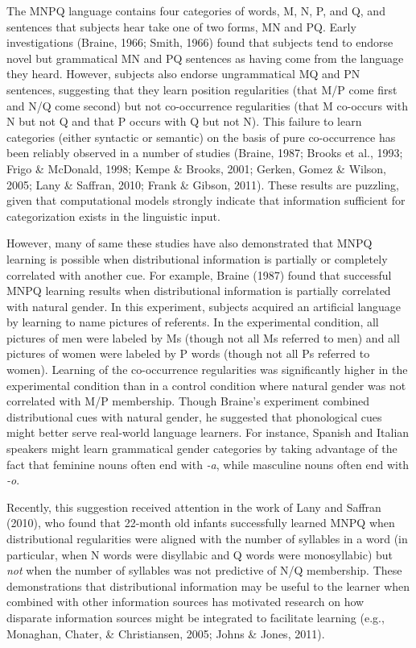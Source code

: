 \documentclass[man,floatsintext]{apa6}
\begin{document}
The MNPQ language contains four categories of words, M, N, P, and Q,
and sentences that subjects hear take one of two forms, MN and
PQ. Early investigations (Braine, 1966; Smith, 1966) found that
subjects tend to endorse novel but grammatical MN and PQ sentences as
having come from the language they heard. However, subjects also
endorse ungrammatical MQ and PN sentences, suggesting that they learn
position regularities (that M/P come first and N/Q come second) but
not co-occurrence regularities (that M co-occurs with N but not Q and
that P occurs with Q but not N). This failure to learn categories
(either syntactic or semantic) on the basis of pure co-occurrence has
been reliably observed in a number of studies (Braine, 1987; Brooks et
al., 1993; Frigo \& McDonald, 1998; Kempe \& Brooks, 2001; Gerken,
Gomez \& Wilson, 2005; Lany \& Saffran, 2010; Frank \& Gibson,
2011). These results are puzzling, given that computational models
strongly indicate that information sufficient for categorization
exists in the linguistic input.

However, many of same these studies have also demonstrated that MNPQ
learning is possible when distributional information is partially or
completely correlated with another cue. For example, Braine (1987)
found that successful MNPQ learning results when distributional
information is partially correlated with natural gender. In this
experiment, subjects acquired an artificial language by learning to
name pictures of referents. In the experimental condition, all
pictures of men were labeled by Ms (though not all Ms referred to men)
and all pictures of women were labeled by P words (though not all Ps
referred to women). Learning of the co-occurrence regularities was
significantly higher in the experimental condition than in a control
condition where natural gender was not correlated with M/P
membership. Though Braine's experiment combined distributional cues
with natural gender, he suggested that phonological cues might better
serve real-world language learners. For instance, Spanish and Italian
speakers might learn grammatical gender categories by taking advantage
of the fact that feminine nouns often end with \emph{-a}, while
masculine nouns often end with \emph{-o}.

Recently, this suggestion received attention in the work of Lany and
Saffran (2010), who found that 22-month old infants successfully
learned MNPQ when distributional regularities were aligned with the
number of syllables in a word (in particular, when N words were
disyllabic and Q words were monosyllabic) but \emph{not} when the
number of syllables was not predictive of N/Q membership. These
demonstrations that distributional information may be useful to the
learner when combined with other information sources has motivated
research on how disparate information sources might be integrated to
facilitate learning (e.g., Monaghan, Chater, \& Christiansen, 2005;
Johns \& Jones, 2011).
\end{document}
